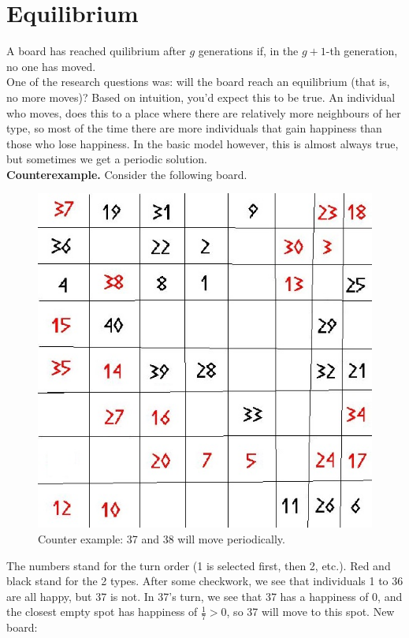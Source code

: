 
\section{Equilibrium}
 A board has reached quilibrium after $g$ generations if, in the $g+1$-th generation, no one has moved.\\
One of the research questions was: will the board reach an equilibrium (that is, no more moves)? Based on intuition, you'd expect this to be true. An individual who moves, does this to a place where there are relatively more neighbours of her type, so most of the time there are more individuals that gain happiness than those who lose happiness. In the basic model however, this is almost always true, but sometimes we get a periodic solution.\\
\textbf{Counterexample.} Consider the following board.
\begin{figure}[h!]
\begin{center}
\includegraphics[scale=0.3]{Tegenvoorbeeld/segregation_tegenvb.jpg}
\end{center}
\caption{Counter example: 37 and 38 will move periodically.}\label{counterexample}
\end{figure}
The numbers stand for the turn order (1 is selected first, then 2, etc.). Red and black stand for the 2 types. After some checkwork, we see that individuals 1 to 36 are all happy, but 37 is not. In 37's turn, we see that 37 has a happiness of $0$, and the closest empty spot has happiness of $\frac{1}{7} > 0$, so 37 will move to this spot. New board:
